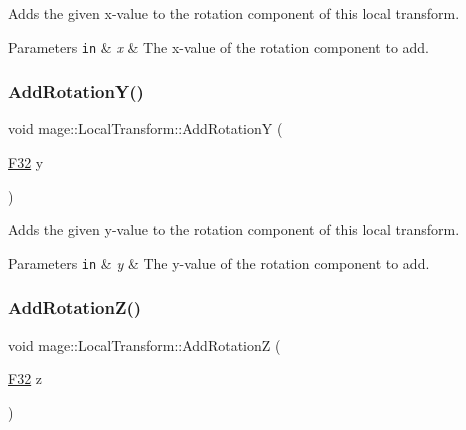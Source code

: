 Adds the given x-\/value to the rotation component of this local transform.


\begin{DoxyParams}[1]{Parameters}
\mbox{\tt in}  & {\em x} & The x-\/value of the rotation component to add. \\
\hline
\end{DoxyParams}
\mbox{\label{classmage_1_1_local_transform_adea3848a1d4d83a836d33668f323bb4d}} 
\subsubsection{\texorpdfstring{Add\+Rotation\+Y()}{AddRotationY()}}
{\footnotesize\ttfamily void mage\+::\+Local\+Transform\+::\+Add\+RotationY (\begin{DoxyParamCaption}\item[{\mbox{\hyperlink{namespacemage_aa97e833b45f06d60a0a9c4fc22ae02c0}{F32}}}]{y }\end{DoxyParamCaption})\hspace{0.3cm}{\ttfamily [noexcept]}}

Adds the given y-\/value to the rotation component of this local transform.


\begin{DoxyParams}[1]{Parameters}
\mbox{\tt in}  & {\em y} & The y-\/value of the rotation component to add. \\
\hline
\end{DoxyParams}
\mbox{\label{classmage_1_1_local_transform_ac769e25872e8a738bd6189f2ca6db4ea}} 
\subsubsection{\texorpdfstring{Add\+Rotation\+Z()}{AddRotationZ()}}
{\footnotesize\ttfamily void mage\+::\+Local\+Transform\+::\+Add\+RotationZ (\begin{DoxyParamCaption}\item[{\mbox{\hyperlink{namespacemage_aa97e833b45f06d60a0a9c4fc22ae02c0}{F32}}}]{z }\end{DoxyParamCaption})\hspace{0.3cm}{\ttfamily [noexcept]}}

